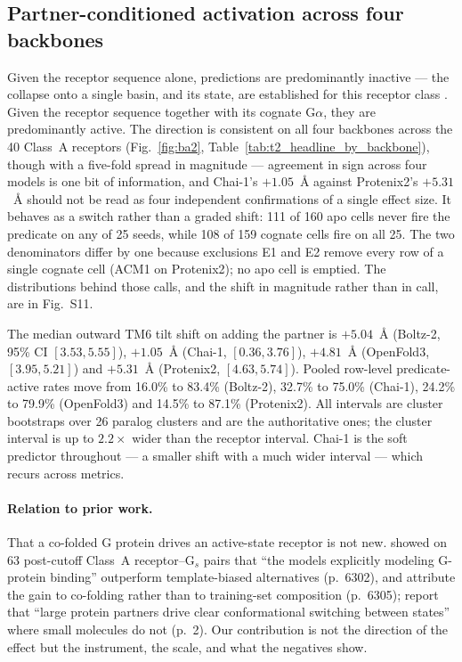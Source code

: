 \subsection*{Partner-conditioned activation across four backbones}

Given the receptor sequence alone, predictions are predominantly inactive ---
the collapse onto a single basin, and its state, are established for this
receptor class \citep{heo2022multistate,chib2025gpcrstates}. Given
the receptor sequence together with its cognate G$\alpha$, they are
predominantly active. The direction is consistent on all four backbones across
the 40 Class~A receptors (Fig.~\ref{fig:ba2}, Table~\ref{tab:t2_headline_by_backbone}), though with a five-fold spread in
magnitude --- agreement in sign across four models is one bit of information, and
Chai-1's $+1.05$~\AA{} against Protenix2's $+5.31$~\AA{} should not be read as
four independent confirmations of a single effect size. It behaves as a switch rather
than a graded shift: 111 of 160 apo cells never fire the predicate on any of 25
seeds, while 108 of 159 cognate cells fire on all 25. The two denominators
differ by one because exclusions E1 and E2 remove every row of a single cognate
cell (ACM1 on Protenix2); no apo cell is emptied. The distributions behind
those calls, and the shift in magnitude rather than in call, are in
Fig.~S11.

The median outward TM6 tilt shift on adding the partner is
$+5.04$~\AA{} (Boltz-2, 95\% CI $[3.53, 5.55]$),
$+1.05$~\AA{} (Chai-1, $[0.36, 3.76]$),
$+4.81$~\AA{} (OpenFold3, $[3.95, 5.21]$) and
$+5.31$~\AA{} (Protenix2, $[4.63, 5.74]$).
Pooled row-level predicate-active rates move from 16.0\% to 83.4\% (Boltz-2),
32.7\% to 75.0\% (Chai-1), 24.2\% to 79.9\% (OpenFold3) and 14.5\% to 87.1\%
(Protenix2). All intervals are cluster bootstraps over 26 paralog clusters and
are the authoritative ones; the cluster interval is up to $2.2\times$ wider than
the receptor interval. Chai-1 is the soft predictor throughout --- a smaller
shift with a much wider interval --- which recurs across metrics.

\paragraph{Relation to prior work.}
That a co-folded G protein drives an active-state receptor is not new.
\citet{chiesa2025templatebias} showed on 63 post-cutoff Class~A receptor--G$_s$
pairs that ``the models explicitly modeling G-protein binding'' outperform
template-biased alternatives (p.~6302), and attribute the gain to co-folding
rather than to training-set composition (p.~6305);
\citet{ye2026multistatebias} report that ``large protein partners drive clear
conformational switching between states'' where small molecules do not (p.~2).
Our contribution is not the direction of the effect but the instrument, the
scale, and what the negatives show.

